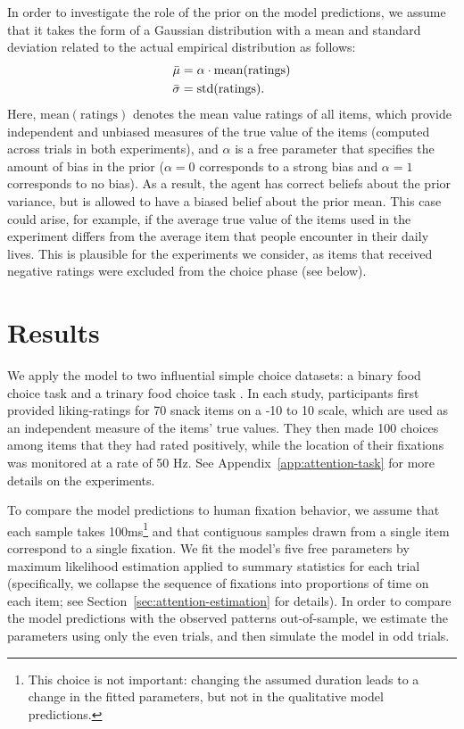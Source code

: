 In order to investigate the role of the prior on the model predictions, we assume that it takes the form of a Gaussian distribution with a mean and standard deviation related to the actual empirical distribution as follows:
\begin{equation}
\begin{aligned}
  \bar{\mu} &= \alpha \cdot \operatorname{mean}(\mathrm{ratings})\\
  \bar{\sigma} &= \operatorname{std}(\mathrm{ratings}).
\end{aligned}
\end{equation}
Here, $\mathrm{mean(ratings)}$ denotes the mean value ratings of all items, which provide independent and unbiased measures of the true value of the items (computed across trials in both experiments), and $\alpha$ is a free parameter that specifies the amount of bias in the prior ($\alpha=0$ corresponds to a strong bias and $\alpha=1$ corresponds to no bias). As a result, the agent has correct beliefs about the prior variance, but is allowed to have a biased belief about the prior mean. This case could arise, for example, if the average true value of the items used in the experiment differs from the average item that people encounter in their daily lives. This is plausible for the experiments we consider, as items that received negative ratings were excluded from the choice phase (see below).

\section{Results}

We apply the model to two influential simple choice datasets: a binary food choice task \citep{krajbich2010visual} and a trinary food choice task \citep{krajbich2011multialternative}. In each study, participants first provided liking-ratings for 70 snack items on a -10 to 10 scale, which are used as an independent measure of the items' true values. They then made 100 choices among items that they had rated positively, while the location of their fixations was monitored at a rate of 50 Hz. See Appendix~\ref{app:attention-task} for more details on the experiments.

To compare the model predictions to human fixation behavior, we assume that each sample takes 100ms\footnote{This choice is not important: changing the assumed duration leads to a change in the fitted parameters, but not in the qualitative model predictions.} and that contiguous samples drawn from a single item correspond to a single fixation. We fit the model's five free parameters by maximum likelihood estimation applied to summary statistics for each trial (specifically, we collapse the sequence of fixations into proportions of time on each item; see Section~\ref{sec:attention-estimation} for details). In order to compare the model predictions with the observed patterns out-of-sample, we estimate the parameters using only the even trials, and then simulate the model in odd trials. 

